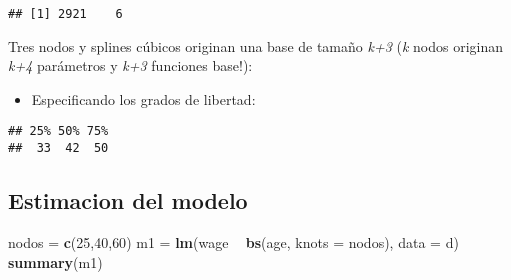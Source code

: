 \documentclass[
]{article}
\newenvironment{Shaded}{\begin{snugshade}}{\end{snugshade}}
\newcommand{\CommentTok}[1]{\textcolor[rgb]{0.56,0.35,0.01}{\textit{#1}}}
\newcommand{\DataTypeTok}[1]{\textcolor[rgb]{0.13,0.29,0.53}{#1}}
\newcommand{\DecValTok}[1]{\textcolor[rgb]{0.00,0.00,0.81}{#1}}
\newcommand{\KeywordTok}[1]{\textcolor[rgb]{0.13,0.29,0.53}{\textbf{#1}}}
\newcommand{\NormalTok}[1]{#1}
\newcommand{\OperatorTok}[1]{\textcolor[rgb]{0.81,0.36,0.00}{\textbf{#1}}}
\newcommand{\StringTok}[1]{\textcolor[rgb]{0.31,0.60,0.02}{#1}}
\providecommand{\tightlist}{%
  \setlength{\itemsep}{0pt}\setlength{\parskip}{0pt}}
\begin{document}
\begin{Shaded}
\end{Shaded}

\begin{verbatim}
## [1] 2921    6
\end{verbatim}

Tres nodos y splines cúbicos originan una base de tamaño \emph{k+3}
(\emph{k} nodos originan \emph{k+4} parámetros y \emph{k+3} funciones
base!):

\begin{itemize}
\tightlist
\item
  Especificando los grados de libertad:
\end{itemize}

\begin{Shaded}
\end{Shaded}

\begin{verbatim}
## 25% 50% 75% 
##  33  42  50
\end{verbatim}

\hypertarget{estimacion-del-modelo}{%
\subsection{Estimacion del modelo}\label{estimacion-del-modelo}}

\begin{Shaded}
\begin{Highlighting}[]
\NormalTok{nodos =}\StringTok{ }\KeywordTok{c}\NormalTok{(}\DecValTok{25}\NormalTok{,}\DecValTok{40}\NormalTok{,}\DecValTok{60}\NormalTok{)}
\NormalTok{m1 =}\StringTok{ }\KeywordTok{lm}\NormalTok{(wage }\OperatorTok{~}\StringTok{ }\KeywordTok{bs}\NormalTok{(age, }\DataTypeTok{knots =}\NormalTok{ nodos), }\DataTypeTok{data =}\NormalTok{ d)}
\KeywordTok{summary}\NormalTok{(m1)}
\end{Highlighting}
\end{Shaded}
\end{document}
